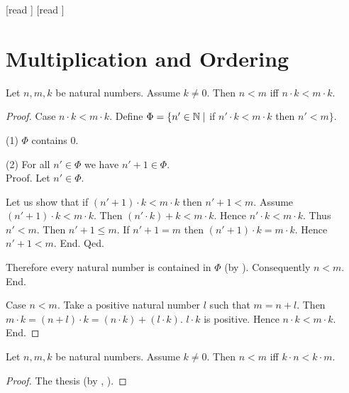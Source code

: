 \documentclass[10pt]{article}
\begin{document}
  \begin{imports}
    \begin{forthel}
      [read ]
      [read ]
    \end{forthel}
  \end{imports}


  \section*{Multiplication and Ordering}

  \begin{forthel}
    \begin{proposition}[id=ARITHMETIC_06_8817333933965312,printid]
      Let $n, m, k$ be natural numbers.
      Assume $k \neq 0$.
      Then $n < m$ iff $n \cdot k < m \cdot k$.
    \end{proposition}
    \begin{proof}
      Case $n \cdot k < m \cdot k$.
        Define $\Phi = \{ n' \in \mathbb{N} \mid$ if $n' \cdot k < m \cdot k$ then $n' < m \}$.

        (1) $\Phi$ contains $0$.

        (2) For all $n' \in \Phi$ we have $n' + 1 \in \Phi$. \\
        Proof.
          Let $n' \in \Phi$.

          Let us show that if $(n' + 1) \cdot k < m \cdot k$ then $n' + 1 < m$.
            Assume $(n' + 1) \cdot k < m \cdot k$.
            Then $(n' \cdot k) + k < m \cdot k$.
            Hence $n' \cdot k < m \cdot k$.
            Thus $n' < m$.
            Then $n' + 1 \leq m$.
            If $n' + 1 = m$ then $(n' + 1) \cdot k = m \cdot k$.
            Hence $n' + 1 < m$.
          End.
        Qed.

        Therefore every natural number is contained in $\Phi$ (by ).
        Consequently $n < m$.
      End.

      Case $n < m$.
        Take a positive natural number $l$ such that $m = n + l$.
        Then $m \cdot k = (n + l) \cdot k = (n \cdot k) + (l \cdot k)$.
        $l \cdot k$ is positive.
        Hence $n \cdot k < m \cdot k$.
      End.
    \end{proof}
  \end{forthel}

  \begin{forthel}
    \begin{corollary}[id=ARITHMETIC_06_5048640368279552,printid]
      Let $n, m, k$ be natural numbers.
      Assume $k \neq 0$.
      Then $n < m$ iff $k \cdot n < k \cdot m$.
    \end{corollary}
    \begin{proof}
      The thesis (by , ).
    \end{proof}
  \end{forthel}
\end{document}
